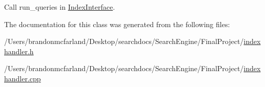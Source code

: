 Call run\+\_\+queries in \hyperlink{class_index_interface}{Index\+Interface}. 



The documentation for this class was generated from the following files\+:\begin{DoxyCompactItemize}
\item 
/\+Users/brandonmcfarland/\+Desktop/searchdocs/\+Search\+Engine/\+Final\+Project/\hyperlink{indexhandler_8h}{indexhandler.\+h}\item 
/\+Users/brandonmcfarland/\+Desktop/searchdocs/\+Search\+Engine/\+Final\+Project/\hyperlink{indexhandler_8cpp}{indexhandler.\+cpp}\end{DoxyCompactItemize}
